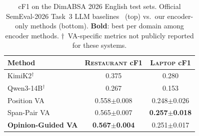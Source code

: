\documentclass[runningheads]{llncs}
\newcommand{\restaurant}{{\normalfont\textsc{Restaurant}}}
\newcommand{\laptop}{{\normalfont\textsc{Laptop}}}
\begin{document}
\begin{table}[t]
\centering\small
\caption{cF1 on the DimABSA 2026 English test sets. Official SemEval-2026 Task~3 LLM baselines~\cite{dimabsa2026} (top) vs.\ our encoder-only methods (bottom). \textbf{Bold}: best per domain among encoder methods. $\dag$~VA-specific metrics not publicly reported for these systems.}
\label{tab:cf1}
\begin{tabular}{@{}lcc@{}}
\toprule
\textbf{Method} & \textbf{\restaurant{} cF1} & \textbf{\laptop{} cF1} \\
\midrule
KimiK2$^\dag$           & 0.375 & 0.280 \\
Qwen3-14B$^\dag$        & 0.267 & 0.153 \\
\midrule
Position VA              & 0.558{\scriptsize$\pm$0.008} & 0.248{\scriptsize$\pm$0.026} \\
Span-Pair VA             & 0.565{\scriptsize$\pm$0.007} & \textbf{0.257}{\scriptsize$\pm$\textbf{0.018}} \\
\textbf{Opinion-Guided VA} & \textbf{0.567}{\scriptsize$\pm$\textbf{0.004}} & 0.251{\scriptsize$\pm$0.017} \\
\bottomrule
\end{tabular}
\end{table}
\end{document}
